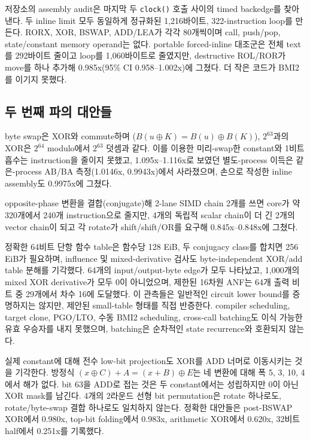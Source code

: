 \documentclass[11pt,a4paper]{article}
\begin{document}
저장소의 assembly audit은 마지막 두 \texttt{clock()} 호출 사이의 timed
backedge를 찾아낸다.  두 inline limit 모두 동일하게 정규화된
1,216바이트, 322-instruction loop를 만든다. RORX, XOR, BSWAP,
ADD/LEA가 각각 80개씩이며 call, push/pop, state/constant memory operand는
없다.  portable forced-inline 대조군은 전체 text를 292바이트 줄이고
loop를 1,060바이트로 줄였지만, destructive ROL/ROR가 move를 하나 추가해
0.985x(95\% CI 0.958--1.002x)에 그쳤다.  더 작은 코드가 BMI2를 이기지
못했다.

\subsection{두 번째 파의 대안들}

byte swap은 XOR와 commute하며
($B(u\mathbin{\oplus}K)=B(u)\mathbin{\oplus}B(K)$), $2^{63}$과의 XOR은
$2^{64}$ modulo에서 $2^{63}$ 덧셈과 같다.  이를 이용한 미리-swap한
constant와 1비트 흡수는 instruction을 줄이지 못했고, 1.095x--1.116x로
보였던 별도-process 이득은 같은-process AB/BA 측정(1.0146x, 0.9943x)에서
사라졌으며, 손으로 작성한 inline assembly도 0.9975x에 그쳤다.

opposite-phase 변환을 결합(conjugate)해 2-lane SIMD chain 2개를 쓰면
core가 약 320개에서 240개 instruction으로 줄지만, 4개의 독립적 scalar
chain이 더 긴 2개의 vector chain이 되고 각 rotate가 shift/shift/OR를
요구해 0.845x--0.848x에 그쳤다.

정확한 64비트 단항 함수 table은 함수당 128 EiB, 두 conjugacy class를
합치면 256 EiB가 필요하며, influence 및 mixed-derivative 검사도
byte-independent XOR/add table 분해를 기각했다. 64개의 input/output-byte
edge가 모두 나타났고, 1,000개의 mixed XOR derivative가 모두 0이 아니었으며,
제한된 16차원 ANF는 64개 출력 비트 중 29개에서 차수 16에 도달했다.  이
관측들은 일반적인 circuit lower bound를 증명하지는 않지만, 제안된
small-table 형태를 직접 반증한다.  compiler scheduling, target clone,
PGO/LTO, 수동 BMI2 scheduling, cross-call batching도 이식 가능한 유효
우승자를 내지 못했으며, batching은 순차적인 state recurrence와
호환되지 않는다.

실제 constant에 대해 전수 low-bit projection도 XOR를 ADD 너머로
이동시키는 것을 기각한다. 방정식
$(x\mathbin{\oplus}C)+A=(x+B)\mathbin{\oplus}E$는 네 변환에 대해
폭 5, 3, 10, 4에서 해가 없다.  bit 63을 ADD로 접는 것은 두 constant에서는
성립하지만 0이 아닌 XOR mask를 남긴다.  4개의 2라운드 선형 bit permutation은
rotate 하나로도, rotate/byte-swap 결합 하나로도 일치하지 않는다.  정확한
대안들은 post-BSWAP XOR에서 0.980x, top-bit folding에서 0.983x, arithmetic
XOR에서 0.620x, 32비트 half에서 0.251x를 기록했다.
\end{document}
